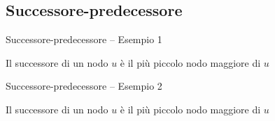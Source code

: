 \subsection{Successore-predecessore}

\begin{frame}{Successore-predecessore -- Esempio 1}

\vspace{-9pt}
\begin{myboxtitle}[Definizione]
Il \alert{successore} di un nodo $u$ è il più piccolo nodo maggiore di $u$ 
\end{myboxtitle}


\end{frame}

\begin{frame}{Successore-predecessore -- Esempio 2}

\vspace{-9pt}
\begin{myboxtitle}[Definizione]
Il \alert{successore} di un nodo $u$ è il più piccolo nodo maggiore di $u$ 
\end{myboxtitle}


\end{frame}



